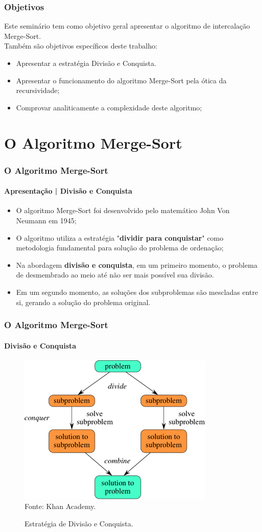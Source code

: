 \documentclass[aspectratio=169]{beamer}
\begin{document}
	\begin{frame}
	\frametitle{Objetivos}
	Este seminário tem como objetivo geral apresentar o algoritmo de intercalação Merge-Sort. \\
	\vspace{0.5cm}
	Também são objetivos específicos deste trabalho:
	\begin{itemize}
		\item Apresentar a estratégia Divisão e Conquista.
		\item Apresentar o funcionamento do algoritmo Merge-Sort pela ótica da recursividade;
		\item Comprovar analiticamente a complexidade deste algoritmo;
	\end{itemize}
	\end{frame}

	\section{O Algoritmo Merge-Sort}
	
	\begin{frame}
		\frametitle{O Algoritmo Merge-Sort}
		\framesubtitle{Apresentação | Divisão e Conquista}
		\begin{itemize}
			\item O algoritmo Merge-Sort foi desenvolvido pelo matemático John Von Neumann em 1945;
			\item O algoritmo utiliza a estratégia "\textbf{dividir para conquistar}" como metodologia fundamental para solução do problema de ordenação;
			\item Na abordagem \textbf{divisão e conquista}, em um primeiro momento, o problema de desmembrado ao meio até não ser mais possível sua divisão.
			\item Em um segundo momento, as soluções dos subproblemas são mescladas entre si, gerando a solução do problema original.
		\end{itemize}	
	\end{frame}

	\begin{frame}
	\frametitle{O Algoritmo Merge-Sort}
	\framesubtitle{Divisão e Conquista}
		\begin{figure}
		\centering
		\caption{Estratégia de Divisão e Conquista.}
		\includegraphics[width=.4\linewidth]{conquest.png}\\
		\footnotesize{Fonte: Khan Academy.}
		\label{conquest}
	\end{figure}
	\end{frame}
\end{document}
